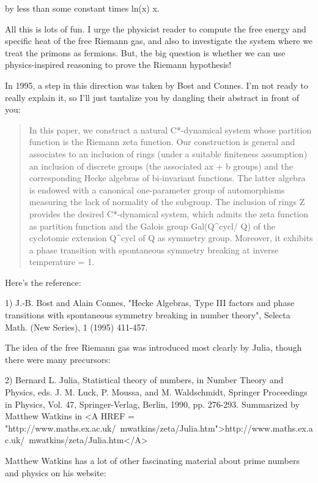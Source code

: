 by less than some constant times ln(x) \sqrt x.  

All this is lots of fun.  I urge the physicist reader to compute the free 
energy and specific heat of the free Riemann gas, and also to investigate
the system where we treat the primons as fermions.  But, the big question 
is whether we can use physics-inspired reasoning to prove the Riemann 
hypothesis!

In 1995, a step in this direction was taken by Bost and Connes.  I'm
not ready to really explain it, so I'll just tantalize you by dangling
their abstract in front of you:

\begin{quote}
    In this paper, we construct a natural C*-dynamical system whose 
    partition function is the Riemann zeta function.  Our construction 
    is general and associates to an inclusion of rings (under a 
    suitable finiteness assumption) an inclusion of discrete groups 
    (the associated ax + b groups) and the corresponding Hecke algebras 
    of bi-invariant functions.  The latter algebra is endowed with a
    canonical one-parameter group of automorphisms measuring the lack 
    of normality of the subgroup.  The inclusion of rings Z provides 
    the desired C*-dynamical system, which admits the zeta function 
    as partition function and the Galois group Gal(Q^{cycl}/ Q) of 
    the cyclotomic extension Q^{cycl} of Q as symmetry group.  Moreover, 
    it exhibits a phase transition with spontaneous symmetry breaking at 
    inverse temperature \beta  = 1.
\end{quote}

Here's the reference:

1) J.-B. Bost and Alain Connes, "Hecke Algebras, Type III factors and phase 
transitions with spontaneous symmetry breaking in number theory", Selecta 
Math. (New Series), 1 (1995) 411-457. 

The idea of the free Riemann gas was introduced most clearly by Julia, 
though there were many precursors:

2) Bernard L. Julia, Statistical theory of numbers, in Number Theory
and Physics, eds.  J. M. Luck, P. Moussa, and M. Waldschmidt, Springer
Proceedings in Physics, Vol. 47, Springer-Verlag, Berlin, 1990,
pp. 276-293.  Summarized by Matthew Watkins in
<A HREF = "http://www.maths.ex.ac.uk/~mwatkins/zeta/Julia.htm">http://www.maths.ex.ac.uk/~mwatkins/zeta/Julia.htm</A>

Matthew Watkins has a lot of other fascinating material about prime numbers
and physics on his website:

